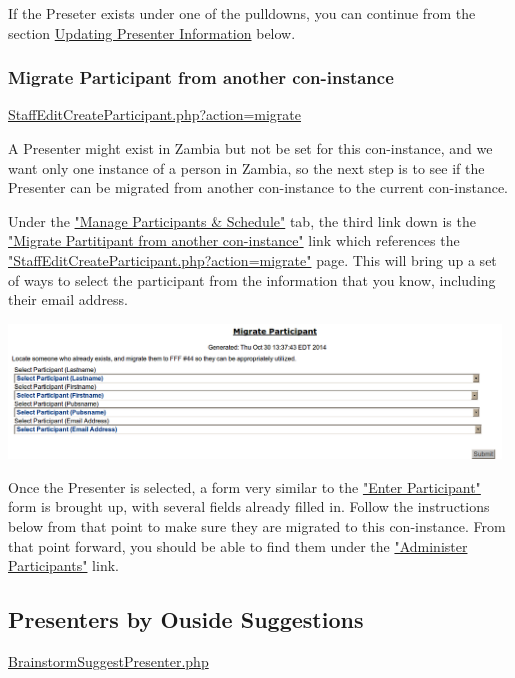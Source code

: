 \documentclass[captions=tablesignature]{scrartcl}
\begin{document}
If the Preseter exists under one of the pulldowns, you can
continue from the section \hyperref[sec-3]{Updating Presenter Information} below.
\subsubsection{Migrate Participant from another con-instance}
\label{sec-2-1-2}
\href{../webpages/StaffEditCreateParticipant.php?action=migrate}{StaffEditCreateParticipant.php?action=migrate}

A Presenter might exist in Zambia but not be set for this
con-instance, and we want only one instance of a person in Zambia,
so the next step is to see if the Presenter can be migrated from
another con-instance to the current con-instance.

Under the \href{../webpages/StaffManageParticipants.php}{"Manage Participants \& Schedule"} tab, the third link
down is the \href{../webpages/StaffEditCreateParticipant.php?action=migrate}{"Migrate Partitipant from another con-instance"} link
which references the
\href{../webpages/StaffEditCreateParticipant.php?action=migrate}{"StaffEditCreateParticipant.php?action=migrate"} page.  This will
bring up a set of ways to select the participant from the
information that you know, including their email address.

\includegraphics[width=0.98\textwidth]{./Images/Migrate_Participant_Header.png}

Once the Presenter is selected, a form very similar to the
\href{../webpages/StaffEditCreateParticipant.php?action=create}{"Enter Participant"} form is brought up, with several fields
already filled in.  Follow the instructions below from that point
to make sure they are migrated to this con-instance.  From that
point forward, you should be able to find them under the
\href{../webpages/AdminParticipants.php}{"Administer Participants"} link.
\subsection{Presenters by Ouside Suggestions}
\label{sec-2-2}
\href{../webpages/BrainstormSuggestPresenter.php}{BrainstormSuggestPresenter.php}
\end{document}
